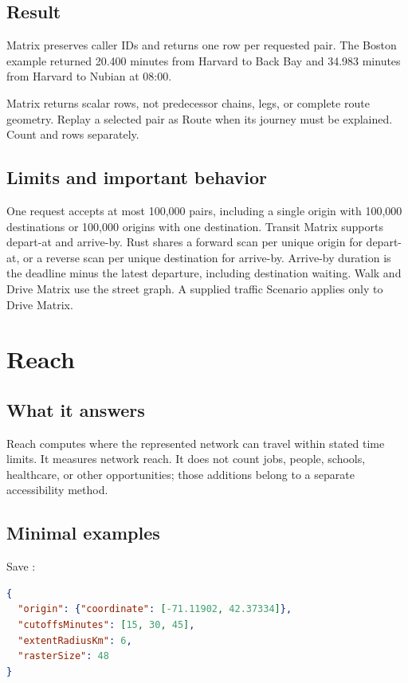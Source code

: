 \documentclass[10pt,letterpaper]{article}
\begin{document}
\subsection{Result}

Matrix preserves caller IDs and returns one row per requested pair. The Boston example returned 20.400 minutes from Harvard to Back Bay and 34.983 minutes from Harvard to Nubian at 08:00.

Matrix returns scalar rows, not predecessor chains, legs, or complete route geometry. Replay a selected pair as Route when its journey must be explained. Count  and  rows separately.

\subsection{Limits and important behavior}

One request accepts at most 100,000 pairs, including a single origin with 100,000 destinations or 100,000 origins with one destination. Transit Matrix supports depart-at and arrive-by. Rust shares a forward scan per unique origin for depart-at, or a reverse scan per unique destination for arrive-by. Arrive-by duration is the deadline minus the latest departure, including destination waiting. Walk and Drive Matrix use the street graph. A supplied traffic Scenario applies only to Drive Matrix.

\section{Reach}

\subsection{What it answers}

Reach computes where the represented network can travel within stated time limits. It measures network reach. It does not count jobs, people, schools, healthcare, or other opportunities; those additions belong to a separate accessibility method.

\subsection{Minimal examples}

Save :

\begin{lstlisting}[language=json]
{
  "origin": {"coordinate": [-71.11902, 42.37334]},
  "cutoffsMinutes": [15, 30, 45],
  "extentRadiusKm": 6,
  "rasterSize": 48
}
\end{lstlisting}
\end{document}
